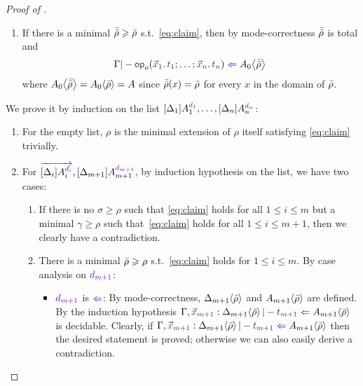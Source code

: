 \begin{proof}[Proof of {}]
\begin{itemize}
\begin{itemize}
\begin{enumerate}
\begin{enumerate}
                \item If there is a minimal $\bar{\bar{\rho}} \geqslant \bar{\rho}$ s.t.\ \eqref{eq:claim}, then by mode-correctness $\bar{\bar{\rho}}$ is total and
                  \[
                    \Gamma |- \tmOpts \chk \simsub{A_0}{\ext{\ext{\rho}}}
                  \]
                  where ${A_0}\!\left<{\bar{\bar{\rho}}}\right> = {A_0}\!\left<{\bar{\rho}}\right> = A$ since $\bar{\bar{\rho}}(x) = \bar{\rho}$ for every $x$ in the domain of $\bar{\rho}$.
              \end{enumerate}
          \end{enumerate}
      \end{itemize}
      \begin{claimproof}
        We prove it by induction on the list $\biargs$:
        \begin{enumerate}
          \item For the empty list, $\rho$ is the minimal extension of $\rho$ itself satisfying \eqref{eq:claim} trivially. 
          \item For $\biargvec, \biarg[m+1]$, by induction hypothesis on the list, we have two cases:
            \begin{enumerate}
              \item If there is no $\sigma \geq \rho$ such that \eqref{eq:claim} holds for all $1 \leq i \leq m$ but a minimal $\gamma \geq \rho$ such that~\eqref{eq:claim} holds for all $1 \leq i \leq m + 1$, then we clearly have a contradiction.
              \item There is a minimal $\bar{\rho} \geqslant \rho$ s.t.\ \eqref{eq:claim} holds for $1 \leq i \leq m$.
                By case analysis on $\dir{d_{m+1}}$:
                \begin{itemize}
                  \item $\dir{d_{m+1}}$ is $\chk$: By mode-correctness, ${\Delta_{m+1}}\!\left<{\bar{\rho}}\right>$ and ${A_{m+1}}\!\left<{\bar{\rho}}\right>$ are defined.
                    By the induction hypothesis $ \Gamma, \vars{x}_\isTerm{m+1} : \simsub{\Delta_{m+1}}{\ext{\rho}} |- \isTerm{t_{m+1}} \chk \simsub{A_{m+1}}{\ext{\rho}}$ is decidable.
                    Clearly, if $\Gamma, \vars{x}_\isTerm{m+1} : \simsub{\Delta_{m+1}}{\ext{\rho}} |- \isTerm{t_{m+1}} \chk \simsub{A_{m+1}}{\ext{\rho}}$ then the desired statement is proved; otherwise we can also easily derive a contradiction.


\end{itemize}
\end{enumerate}
\end{enumerate}
\end{claimproof}
\end{itemize}
\end{proof}
